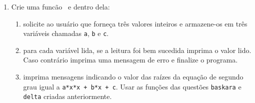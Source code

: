 \begin{enumerate}
  \item Crie uma funcão \MAIN\ e dentro dela:
    \begin{enumerate}
      \item solicite ao usuário que forneça três valores inteiros e armazene-os em três variáveis chamadas {\tt a}, {\tt b} e {\tt c}.
      \item para cada variável lida, se a leitura foi bem sucedida imprima o valor lido. Caso contrário imprima uma mensagem de erro e finalize o programa.
      \item imprima mensagens indicando o valor das raízes da equação de segundo grau igual a {\tt a*x*x + b*x + c}. Usar as funções das questões {\tt baskara} e {\tt delta} criadas anteriormente.
    \end{enumerate}

\end{enumerate}
